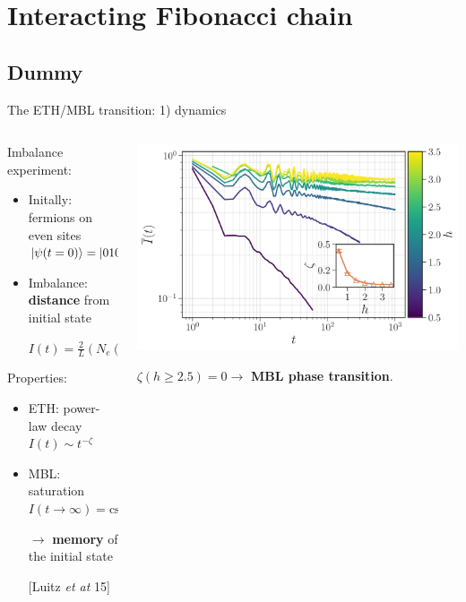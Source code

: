 \section{Interacting Fibonacci chain}
\subsection{Dummy}
\begin{frame}{The ETH/MBL transition: 1) dynamics}
\begin{columns}
\begin{column}{0.5\textwidth}
Imbalance experiment:
\begin{itemize}
	\item Initally: fermions on even sites $\ket{\psi(t=0)} = \ket{0101\dots}$
	\item Imbalance: \textbf{distance} from initial state
	
	$I(t) = \frac{2}{L}(N_e(t) - N_o(t))$
\end{itemize}

Properties:
\begin{itemize}
	\item \textcolor{comp}{ETH: power-law decay} $I(t) \sim t^{-\zeta}$
	\item \textcolor{BostonBlue}{MBL: saturation} $I(t\to \infty) = \text{cst} > 0$ 
	
	$\to$ \textbf{memory} of the initial state
	
	{\footnotesize [Luitz \emph{et at} 15]}
\end{itemize}
\end{column}
\begin{column}{0.5\textwidth}
\centering
\includegraphics[width=\textwidth]{img/3_Fibonacci/imbalance}

$\zeta(h \geq 2.5) = 0 \to$ \textbf{MBL phase transition}.
\end{column}
\end{columns}
\end{frame}

